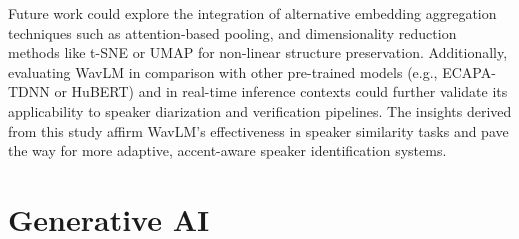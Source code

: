 \documentclass[conference]{IEEEtran}
\begin{document}
Future work could explore the integration of alternative embedding aggregation techniques such as attention-based pooling, and dimensionality reduction methods like t-SNE or UMAP for non-linear structure preservation. Additionally, evaluating WavLM in comparison with other pre-trained models (e.g., ECAPA-TDNN or HuBERT) and in real-time inference contexts could further validate its applicability to speaker diarization and verification pipelines. The insights derived from this study affirm WavLM’s effectiveness in speaker similarity tasks and pave the way for more adaptive, accent-aware speaker identification systems.

\section*{Generative AI}

\printbibliography


	
\end{document}
